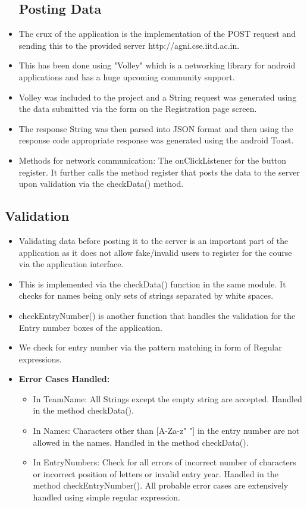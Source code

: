 \documentclass[12pt]{article}
\begin{document}
\begin{itemize}
\subsection{Posting Data}
\item The crux of the application is the implementation of the POST request and sending this to the provided server http://agni.cse.iitd.ac.in.
\item This has been done using "Volley" which is a networking library for android applications and has a huge upcoming community support.
\item Volley was included to the project and a String request was generated using the data submitted via the form on the Registration page screen.
\item The response String was then parsed into JSON format and then using the response code appropriate response was generated using the android Toast.
\item Methods for network communication: The onClickListener for the button register. It further calls the method register that posts the data to the server upon validation via the checkData() method.
\end{itemize}


\subsection{Validation}
\begin{itemize}
\item Validating data before posting it to the server is an important part of the application as it does not allow fake/invalid users to register for the course via the application interface.
\item This is implemented via the checkData() function in the same module. It checks for names being only sets of strings separated by white spaces.
\item checkEntryNumber() is another function that handles the validation for the Entry number boxes of the application.
\item We check for entry number via the pattern matching in form of Regular expressions.
\item \textbf{Error Cases Handled:}
\begin{itemize}
		\item In TeamName: All Strings except the empty string are accepted. Handled in the method checkData().
		\item In Names: Characters other than [A-Za-z" "] in the entry number are not allowed in the names. Handled in the method checkData().
        \item In EntryNumbers: Check for all errors of incorrect number of characters or incorrect position of letters or invalid entry year. Handled in the method checkEntryNumber(). All probable error cases are extensively handled using simple regular expression.
	\end{itemize}
\end{itemize}
    
\end{document}
